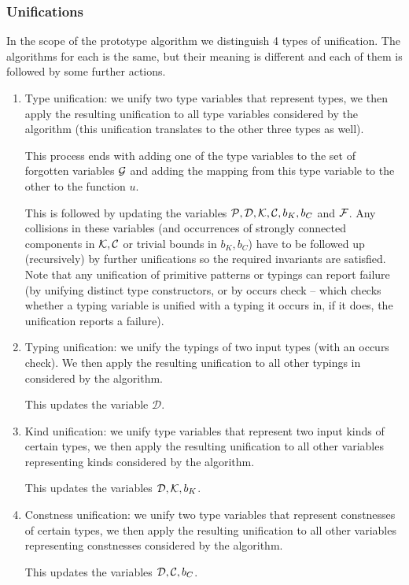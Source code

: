 \subsubsection{Unifications}
\label{unifications}

In the scope of the prototype algorithm we distinguish 4 types of unification. The algorithms for each is the same, but their meaning is different and each of them is followed by some further actions.

\begin{enumerate}
    \item Type unification: we unify two type variables that represent types, we then apply the resulting unification to all type variables considered by the algorithm (this unification translates to the other three types as well). \label{tUni}

    This process ends with adding one of the type variables to the set of forgotten variables $\mathcal G$ and adding the mapping from this type variable to the other to the function $u$.

    This is followed by updating the variables $\mathcal P, \mathcal D, \mathcal K, \mathcal C, b_K, b_C$ and $\mathcal F$. Any collisions in these variables (and occurrences of strongly connected components in $\mathcal K, \mathcal C$ or trivial bounds in $b_K, b_C$) have to be followed up (recursively) by further unifications so the required invariants are satisfied. Note that any unification of primitive patterns or typings can report failure (by unifying distinct type constructors, or by occurs check -- which checks whether a typing variable is unified with a typing it occurs in, if it does, the unification reports a failure).

    \item Typing unification: we unify the typings of two input types (with an occurs check). We then apply the resulting unification to all other typings in considered by the algorithm. \label{tyUni}

    This updates the variable $\mathcal D$.

    \item Kind unification: we unify type variables that represent two input kinds of certain types, we then apply the resulting unification to all other variables representing kinds considered by the algorithm. \label{kUni}

    This updates the variables $\mathcal D, \mathcal K, b_K$.

    \item Constness unification: we unify two type variables that represent constnesses of certain types, we then apply the resulting unification to all other variables representing constnesses considered by the algorithm. \label{cUni}

    This updates the variables $\mathcal D, \mathcal C, b_C$.
\end{enumerate}

